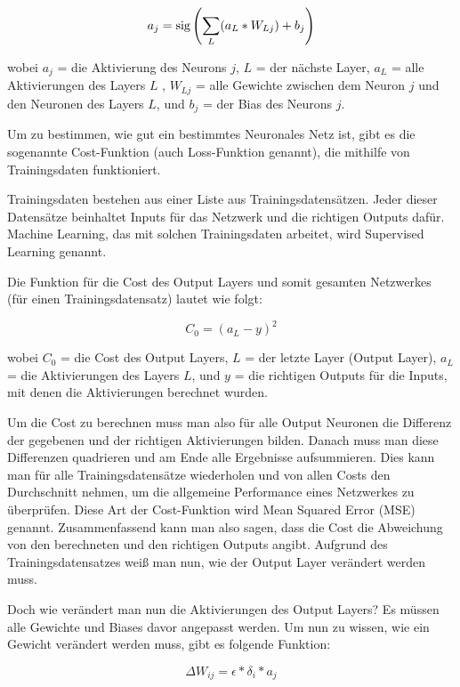 \documentclass{scrartcl}
\begin{document}
	{\Large \[
		a_{j} = \textrm{sig}\left(\sum_{L} (a_{L} * W_{Lj}) + b_{j}\right)
		\]}
		
	\noindent wobei $a_j$ = die Aktivierung des Neurons $j$, $L$ = der nächste Layer, $a_L$ = alle Aktivierungen des Layers $L$ , $W_{Lj}$ = alle Gewichte zwischen dem Neuron $j$ und den Neuronen des Layers $L$, und $b_j$ = der Bias des Neurons $j$.
	

	Um zu bestimmen, wie gut ein bestimmtes Neuronales Netz ist, gibt es die sogenannte Cost-Funktion (auch Loss-Funktion genannt), die mithilfe von Trainingsdaten funktioniert.
	
	Trainingsdaten bestehen aus einer Liste aus Trainingsdatensätzen. Jeder dieser Datensätze beinhaltet Inputs für das Netzwerk und die richtigen Outputs dafür. Machine Learning, das mit solchen Trainingsdaten arbeitet, wird Supervised Learning genannt.

	Die Funktion für die Cost des Output Layers und somit gesamten Netzwerkes (für einen Trainingsdatensatz) lautet wie folgt:

	{\Large \[
		C_0 = (a_L - y)^2
	\]}


	\noindent wobei $C_0$ = die Cost des Output Layers, $L$ = der letzte Layer (Output Layer), $a_L$ = die Aktivierungen des Layers $L$, und $y$ = die richtigen Outputs für die Inputs, mit denen die Aktivierungen berechnet wurden. 
	
	Um die Cost zu berechnen muss man also für alle Output Neuronen die Differenz der gegebenen und der richtigen Aktivierungen bilden. Danach muss man diese Differenzen quadrieren und am Ende alle Ergebnisse aufsummieren. Dies kann man für alle Trainingsdatensätze wiederholen und von allen Costs den Durchschnitt nehmen, um die allgemeine Performance eines Netzwerkes zu überprüfen. Diese Art der Cost-Funktion wird Mean Squared Error (MSE) genannt. Zusammenfassend kann man also sagen, dass die Cost die Abweichung von den berechneten und den richtigen Outputs angibt.
	Aufgrund des Trainingsdatensatzes weiß man nun, wie der Output Layer verändert werden
	muss.


	Doch wie verändert man nun die Aktivierungen des Output Layers? Es müssen alle Gewichte und Biases davor angepasst werden. Um nun zu wissen, wie ein Gewicht verändert werden muss, gibt es folgende Funktion:

	\[
		\Delta W_{ij} = \epsilon * \delta_i * a_j
	\]
\end{document}

